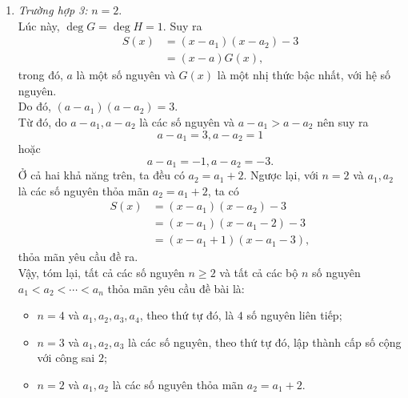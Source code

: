 \begin{bt}
{\begin{enumerate}
			Do đó, $(a-a_1)(a-a_2)(a-a_3)=3$.\\
			Từ đó, do $a-a_1, a-a_2, a-a_3$ là các số nguyên và $a-a_1>a-a_2>a-a_3$ nên suy ra
			$$ a-a_1=1, a-a_2=-1\mbox{ và } a-a_3=-3. $$
			Như vậy, $a_1,a_2,a_3$ là một cấp số cộng với công sai $2$.\\
			Ngược lại, với $n=3$ và $a_1, a_2, a_3$ là các số nguyên, theo thứ tự đó, lập thành cấp số cộng với công sai $2$, ta có
			\begin{align*}
			S(x)&=(x-a_1)(x-a_2)(x-a_3)-3\\
			&=(x-a_1)(x-a_1-2)(x-a_1-4)-3\\
			&=(x-a_1-1)[(x-a_1)^2-5(x-a_1)+3],
			\end{align*}
			thỏa mãn yêu cầu đề ra.
			\item \textit{Trường hợp 3:} $n=2$.\\
			Lúc này, $\deg G=\deg H=1$. Suy ra
			\begin{align*}
			S(x)&=(x-a_1)(x-a_2)-3\\
			&=(x-a)G(x),
			\end{align*}
			trong đó, $a$ là một số nguyên và $G(x)$ là một nhị thức bậc nhất, với hệ số nguyên.\\
			Do đó, $(a-a_1)(a-a_2)=3$.\\
			Từ đó, do $a-a_1, a-a_2$ là các số nguyên và $a-a_1>a-a_2$ nên suy ra
			$$a-a_1=3, a-a_2=1$$
			hoặc
			$$a-a_1=-1, a-a_2=-3.$$
			Ở cả hai khả năng trên, ta đều có $a_2=a_1+2$.
			Ngược lại, với $n=2$ và $a_1, a_2$ là các số nguyên thỏa mãn $a_2=a_1+2$, ta có
			\begin{align*}
			S(x)&=(x-a_1)(x-a_2)-3\\
			&=(x-a_1)(x-a_1-2)-3\\
			&=(x-a_1+1)(x-a_1-3),
			\end{align*}
			thỏa mãn yêu cầu đề ra.\\
			Vậy, tóm lại, tất cả các số nguyên $n\geq 2$ và tất cả các bộ $n$ số nguyên $a_1<a_2<\cdots <a_n$ thỏa mãn yêu cầu đề bài là:
			\begin{itemize}
				\item $n=4$ và $a_1, a_2, a_3, a_4$, theo thứ tự đó, là $4$ số nguyên liên tiếp;
				\item $n=3$ và $a_1, a_2, a_3$ là các số nguyên, theo thứ tự đó, lập thành cấp số cộng với công sai $2$;
				\item $n=2$ và $a_1, a_2$ là các số nguyên thỏa mãn $a_2=a_1+2$.
			\end{itemize}
		\end{enumerate}
	}
\end{bt}

